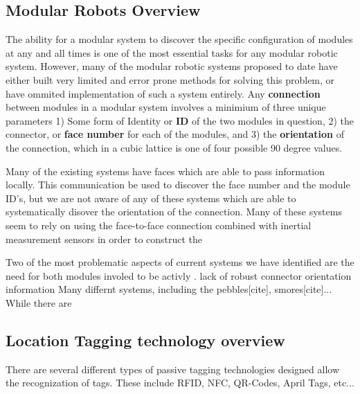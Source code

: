 \subsection{Modular Robots Overview}
\label{sec:RWconfiguration}
	The ability for a modular system to discover the specific configuration of modules at any and all times is one of the most essential tasks for any modular robotic system. However, many of the modular robotic systems proposed to date have either built very limited and error prone methods for solving this problem, or have ommited implementation of such a system entirely. Any \textbf{connection} between modules in a modular system involves a minimium of three unique parameters 1) Some form of Identity or \textbf{ID} of the two modules in question, 2) the connector, or \textbf{face number} for each of the modules, and 3) the \textbf{orientation} of the connection, which in a cubic lattice is one of four possible 90 degree values.
		
	Many of the existing systems have faces which are able to pass information locally. This communication be used to discover the face number and the module ID's, but we are not aware of any of these systems which are able to systematically disover the orientation of the connection. Many of these systems seem to rely on using the face-to-face connection combined with inertial measurement sensors in order to construct the 
	
	Two of the most problematic aspects of current systems we have identified are the need for both modules involed to be activly . lack of robust connector orientation information
	Many differnt systems, including the pebbles[cite], smores[cite]... While there are 

	

\subsection{Location Tagging technology overview}
\label{sec:RWtaggingTech}

There are several different types of passive tagging technologies designed allow the recognization of tags. These include RFID, NFC, QR-Codes, April Tags, etc... 


